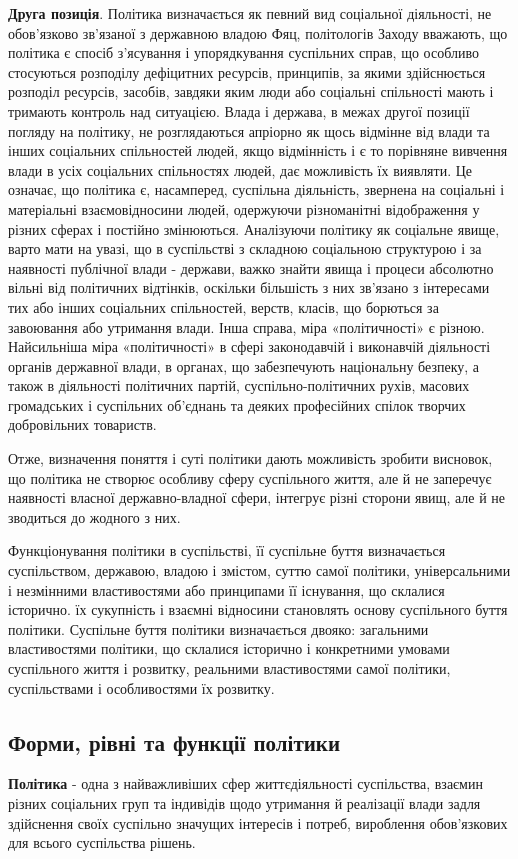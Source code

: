 \textbf{Друга позиція}. Політика визначається як певний вид соціальної діяльності, не обов'язково зв'язаної з державною владою Фяц, політологів Заходу вважають, що політика є спосіб з'ясування і упорядкування суспільних справ, що особливо стосуються розподілу дефіцитних ресурсів, принципів, за якими здійснюється розподіл ресурсів, засобів, завдяки яким люди або соціальні спільності мають і тримають контроль над ситуацією. Влада і держава, в межах другої позиції погляду на політику, не розглядаються апріорно як щось відмінне від влади та інших соціальних спільностей людей, якщо відмінність і є то порівняне вивчення влади в усіх соціальних спільностях людей, дає можливість їх виявляти. Це означає, що політика є, насамперед, суспільна діяльність, звернена на соціальні і матеріальні взаємовідносини людей, одержуючи різноманітні відображення у різних сферах і постійно змінюються. Аналізуючи політику як соціальне явище, варто мати на увазі, що в суспільстві з складною соціальною структурою і за наявності публічної влади - держави, важко знайти явища і процеси абсолютно вільні від політичних відтінків, оскільки більшість з них зв'язано з інтересами тих або інших соціальних спільностей, верств, класів, що борються за завоювання або утримання влади. Інша справа, міра «політичності» є різною. Найсильніша міра «політичності» в сфері законодавчій і виконавчій діяльності органів державної влади, в органах, що забезпечують національну безпеку, а також в діяльності політичних партій, суспільно-політичних рухів, масових громадських і суспільних об'єднань та деяких професійних спілок творчих добровільних товариств.

Отже, визначення поняття і суті політики дають можливість зробити висновок, що політика не створює особливу сферу суспільного життя, але й не заперечує наявності власної державно-владної сфери, інтегрує різні сторони явищ, але й не зводиться до жодного з них.

Функціонування політики в суспільстві, її суспільне буття визначається суспільством, державою, владою і змістом, суттю самої політики, універсальними і незмінними властивостями або принципами її існування, що склалися історично. їх сукупність і взаємні відносини становлять основу суспільного буття політики. Суспільне буття політики визначається двояко: загальними властивостями політики, що склалися історично і конкретними умовами суспільного життя і розвитку, реальними властивостями самої політики, суспільствами і особливостями їх розвитку.
\subsection{Форми, рівні та функції політики}
\textbf{Політика} - одна з найважливіших сфер життєдіяльності суспільства, взаємин різних соціальних груп та індивідів щодо утримання й реалізації влади задля здійснення своїх суспільно значущих інтересів і потреб, вироблення обов’язкових для всього суспільства рішень.

